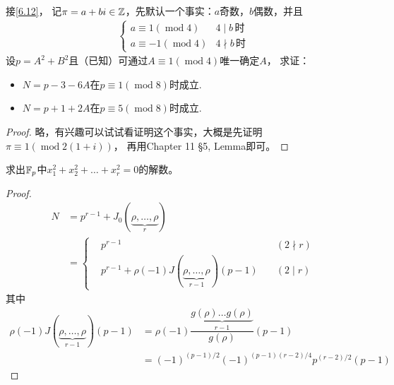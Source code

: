 \begin{exercise}\label{6.13}
    接\ref{6.12}，
 记$\pi=a+bi\in\mathbb{Z}$，先默认一个事实：$a$奇数，$b$偶数，并且
 \begin{align*}
    \begin{cases}
        a\equiv1(\operatorname{mod}4)&4\mid b\,时\\
        a\equiv-1(\operatorname{mod}4)&4\nmid b\,时
    \end{cases}
 \end{align*}
   设$p=A^2+B^2$且（已知）可通过$A\equiv1(\operatorname{mod}4)$唯一确定$A$，
   求证：
   \begin{itemize}
    \item[(1)] $N=p-3-6A$在$p\equiv1(\operatorname{mod}8)$时成立.
    \item[(2)] $N=p+1+2A$在$p\equiv5(\operatorname{mod}8)$时成立.
   \end{itemize}
\end{exercise}
\begin{proof}
    略，有兴趣可以试试看证明这个事实，大概是先证明$\pi\equiv1(\operatorname{mod}2(1+i))$，
    再用Chapter 11 \S 5, Lemma即可。
\end{proof}

\begin{exercise}\label{6.14}
   求出$\mathbb{F}_p$中$x_1^2+x_2^2+\ldots+x_r^2=0$的解数。
\end{exercise}
\begin{proof}
    \begin{align*}
        N&=p^{r-1}+J_0(\underbrace{\rho,\ldots,\rho}_{r})\\
        &=\left\{ 
        \begin{aligned}
            &p^{r-1}\quad&(2\nmid r)\\
            &p^{r-1}+\rho(-1)J(\underbrace{\rho,\ldots,\rho}_{r-1})(p-1)\quad&(2\mid r)
        \end{aligned}
         \right.
    \end{align*}
    其中
    \begin{align*}
        \rho(-1)J(\underbrace{\rho,\ldots,\rho}_{r-1})(p-1)
        &=\rho(-1)\dfrac{\underbrace{g(\rho)\ldots g(\rho)}_{r-1}}{g(\rho)}(p-1)\\
        &=(-1)^{(p-1)/2}(-1)^{(p-1)(r-2)/4}p^{(r-2)/2}(p-1)
    \end{align*}
\end{proof}


